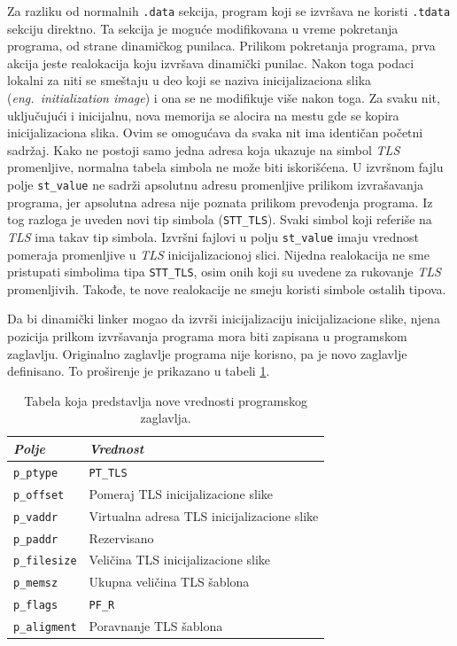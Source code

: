 \documentclass[12pt,oneside]{memoir}
\begin{document}
Za razliku od normalnih \texttt{.data} sekcija, program koji se izvršava ne koristi \texttt{.tdata} sekciju direktno. Ta sekcija je moguće modifikovana u vreme pokretanja programa, od strane dinamičkog punilaca. Prilikom pokretanja programa, prva akcija jeste realokacija koju izvršava dinamički punilac. Nakon toga podaci lokalni za niti se smeštaju u deo koji se naziva inicijalizaciona slika (\emph{eng.~initialization image}) i ona se ne modifikuje više nakon toga. Za svaku nit, uključujući i inicijalnu, nova memorija se alocira na mestu gde se kopira inicijalizaciona slika. Ovim se omogućava da svaka nit ima identičan početni sadržaj. Kako ne postoji samo jedna adresa koja ukazuje na simbol \emph{TLS} promenljive, normalna tabela simbola ne može biti iskorišćena. U izvršnom fajlu polje \texttt{st\_value} ne sadrži apsolutnu adresu promenljive prilikom izvrašavanja programa, jer apsolutna adresa nije poznata prilikom prevođenja programa. Iz tog razloga  je uveden novi tip simbola (\texttt{STT\_TLS}). Svaki simbol koji referiše na \emph{TLS} ima takav tip simbola. Izvršni fajlovi u polju \texttt{st\_value} imaju vrednost pomeraja promenljive u \emph{TLS} inicijalizacionoj slici.
Nijedna realokacija ne sme pristupati simbolima tipa \texttt{STT\_TLS}, osim onih koji su uvedene za rukovanje \emph{TLS} promenljivih. Takođe, te nove realokacije ne smeju koristi simbole ostalih tipova.

Da bi dinamički linker mogao da izvrši inicijalizaciju inicijalizacione slike, njena pozicija prilkom izvršavanja programa mora biti zapisana u programskom zaglavlju. Originalno zaglavlje programa nije korisno, pa je novo zaglavlje definisano. To proširenje je prikazano u tabeli \ref{tab:tls_prheader}.

\begin{table}
		\begin{center}
		\begin{tabular}{ | l | l |}
			\hline
			\emph{Polje} & \emph{Vrednost} \\ \hline
			\texttt{p\_ptype} & \texttt{PT\_TLS} \\ \hline
			\texttt{p\_offset} & Pomeraj TLS inicijalizacione slike  \\ \hline
			\texttt{p\_vaddr} & Virtualna adresa TLS inicijalizacione slike  \\ \hline
			\texttt{p\_paddr} & Rezervisano  \\ \hline
			\texttt{p\_filesize} & Veličina TLS inicijalizacione slike  \\ \hline
			\texttt{p\_memsz} & Ukupna veličina TLS šablona  \\ \hline
			\texttt{p\_flags} & \texttt{PF\_R}  \\ \hline
			\texttt{p\_aligment} & Poravnanje TLS šablona  \\ \hline
		\end{tabular}
	   \end{center}
		\caption{\label{tab:tls_prheader}Tabela koja predstavlja nove vrednosti programskog zaglavlja.}
\end{table}
\end{document}
